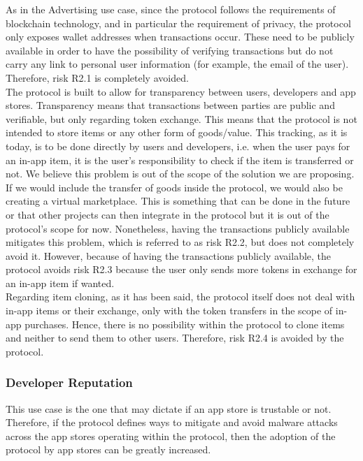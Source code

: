 As in the Advertising use case, since the protocol follows the requirements of blockchain technology, and in particular the requirement of privacy, the protocol only exposes wallet addresses when transactions occur. These need to be publicly available in order to have the possibility of verifying transactions but do not carry any link to personal user information (for example, the email of the user). Therefore, risk \textsf{R2.1} is completely avoided. \\

The protocol is built to allow for transparency between users, developers and app stores. Transparency means that transactions between parties are public and verifiable, but only regarding token exchange. This means that the protocol is not intended to store items or any other form of goods/value. This tracking, as it is today, is to be done directly by users and developers, i.e. when the user pays for an in-app item, it is the user's responsibility to check if the item is transferred or not. We believe this problem is out of the scope of the solution we are proposing. If we would include the transfer of goods inside the protocol, we would also be creating a virtual marketplace. This is something that can be done in the future or that other projects can then integrate in the protocol but it is out of the protocol's scope for now. Nonetheless, having the transactions publicly available mitigates this problem, which is referred to as risk \textsf{R2.2}, but does not completely avoid it. However, because of having the transactions publicly available, the protocol avoids risk \textsf{R2.3} because the user only sends more tokens in exchange for an in-app item if wanted. \\

Regarding item cloning, as it has been said, the protocol itself does not deal with in-app items or their exchange, only with the token transfers in the scope of in-app purchases. Hence, there is no possibility within the protocol to clone items and neither to send them to other users. Therefore, risk \textsf{R2.4} is avoided by the protocol.


\subsubsection{Developer Reputation}

This use case is the one that may dictate if an app store is trustable or not. Therefore, if the protocol defines ways to mitigate and avoid malware attacks across the app stores operating within the protocol, then the adoption of the protocol by app stores can be greatly increased. \\

